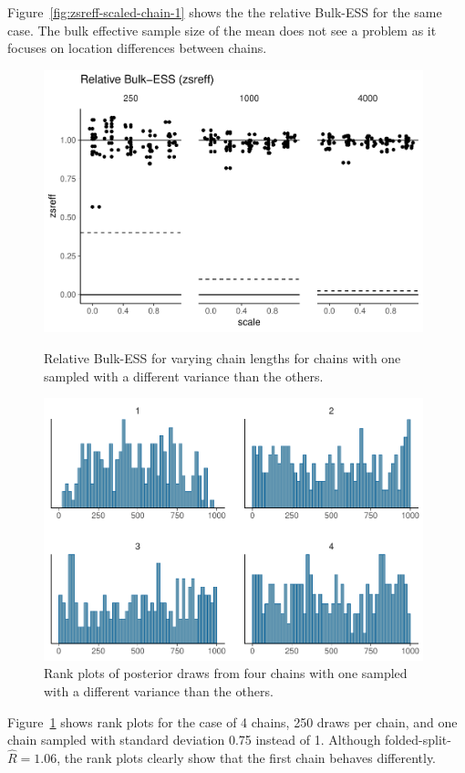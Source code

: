 \documentclass[american,]{article}
\theoremstyle{definition}
\begin{document}
Figure~\ref{fig:zsreff-scaled-chain-1} shows the the relative Bulk-ESS
for the same case. The bulk effective sample
size of the mean does not see a problem as it focuses on location
differences between chains.
\begin{figure}[tp]
  \centering
  \begin{minipage}{0.48\textwidth}
  \includegraphics[width=0.98\textwidth]{graphics/zsreff-scaled-chain-1.pdf}
  \caption{Relative Bulk-ESS for varying chain lengths for chains with
    one sampled with a different variance than the others.}
  \label{fig:zsreff-scaled-chain-1}
\end{minipage}
\hfill
  \begin{minipage}{0.48\textwidth}
  \includegraphics[width=0.98\textwidth]{graphics/hist-scaled-chain-1.pdf}
  \caption{Rank plots of posterior draws from four chains with
    one sampled with a different variance than the others.}
  \label{fig:hist-scaled-chain-1}
\end{minipage}
\end{figure}
Figure~\ref{fig:hist-scaled-chain-1} shows rank plots for the case of
4 chains, 250 draws per chain, and one chain sampled with standard
deviation 0.75 instead of 1. Although
folded-split-\(\widehat{R} = 1.06\), the rank plots clearly show that
the first chain behaves differently.
\end{document}
